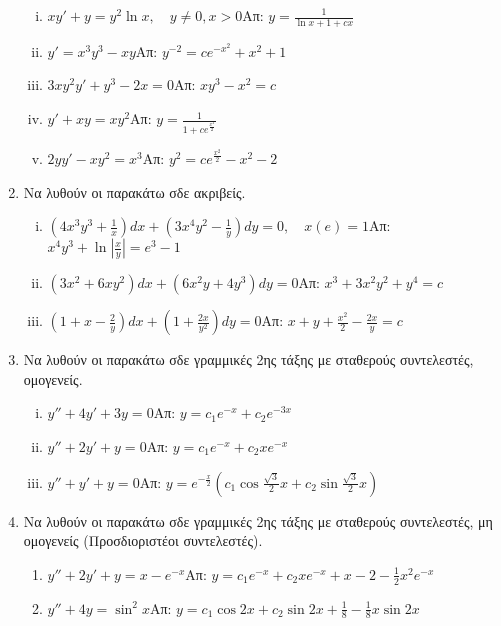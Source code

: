 \documentclass[a4paper,12pt]{article}
\begin{document}
\begin{enumerate}
\begin{enumerate}[i)]
\item $xy'+y=y^2\ln x, \quad y\neq 0, x>0$\hfill Απ: $y=\frac{1}{\ln x+1+cx}$
\item $y'=x^3y^3-xy$\hfill Απ: $y^{-2}=ce^{-x^2}+x^2+1$
\item $3xy^2y'+y^3-2x=0$\hfill Απ: $xy^3-x^2=c$
\item $y'+xy=xy^2$\hfill Απ: $y=\frac{1}{1+ce^{\frac{x^2}{2}}}$
\item $2yy'-xy^2=x^3$\hfill Απ: $y^2=ce^{\frac{x^2}{2}}-x^2-2$

\end{enumerate}

\item Να λυθούν οι παρακάτω σδε ακριβείς.

\begin{enumerate}[i)]

\item $(4x^3y^3+\frac{1}{x})dx+(3x^4y^2-\frac{1}{y})dy=0, \quad x(e)=1$\hfill Απ: $x^4y^3+\ln |\frac{x}{y}|=e^3-1$
\item $(3x^2+6xy^2)dx+(6x^2y+4y^3)dy=0$\hfill Απ: $x^3+3x^2y^2+y^4=c$
\item $(1+x-\frac{2}{y})dx+(1+\frac{2x}{y^2})dy=0$\hfill Απ: $x+y+\frac{x^2}{2}-\frac{2x}{y}=c$
\end{enumerate}

\item Να λυθούν οι παρακάτω σδε γραμμικές 2ης τάξης με σταθερούς συντελεστές, ομογενείς.

\begin{enumerate}[i)]

\item $y''+4y'+3y=0$\hfill Απ: $y=c_1e^{-x}+c_2e^{-3x}$
\item $y''+2y'+y=0$\hfill Απ: $y=c_1e^{-x}+c_2xe^{-x}$
\item $y''+y'+y=0$\hfill Απ: $y=e^{-\frac{x}{2}}(c_1\cos\frac{\sqrt3}{2}x+c_2\sin\frac{\sqrt{3}}{2}x)$

\end{enumerate}

\item Να λυθούν οι παρακάτω σδε γραμμικές 2ης τάξης με σταθερούς συντελεστές, μη ομογενείς (Προσδιοριστέοι συντελεστές).

\begin{enumerate}

\item $y''+2y'+y=x-e^{-x}$\hfill Απ: $y=c_1e^{-x}+c_2xe^{-x}+x-2-\frac{1}{2}x^2e^{-x}$
\item $y''+4y=\sin^2x$\hfill Απ: $y=c_1\cos 2x+c_2\sin 2x+\frac{1}{8}-\frac{1}{8}x\sin 2x$


\end{enumerate}
\end{enumerate}
\end{document}
